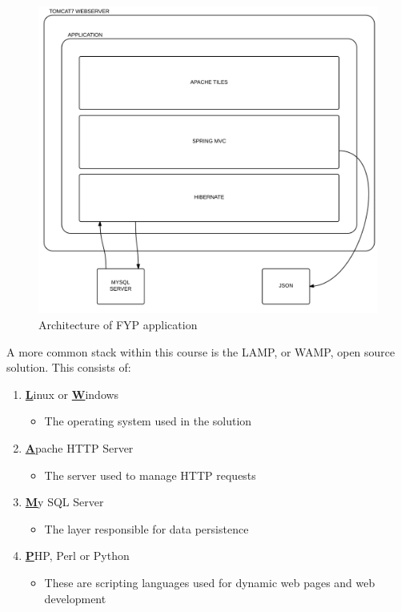 \begin{figure}[H]
\begin{center}
\includegraphics[scale=0.20]{projarch.PNG}
\end{center}
\caption{Architecture of FYP application}
\label{fig:projstack}
\end{figure}

A more common stack within this course is the LAMP, or WAMP, open source solution. This consists of: 

\begin{enumerate}
\item \underline{\textbf{L}}inux or \underline{\textbf{W}}indows
\begin{itemize}
\item The operating system used in the solution
\end{itemize}
\item \underline{\textbf{A}}pache HTTP Server
\begin{itemize}
\item The server used to manage HTTP requests
\end{itemize}
\item \underline{\textbf{M}}y SQL Server
\begin{itemize}
\item The layer responsible for data persistence
\end{itemize}
\item \underline{\textbf{P}}HP, Perl or Python
\begin{itemize}
\item These are scripting languages used for dynamic web pages and web development
\end{itemize}
\end{enumerate}

